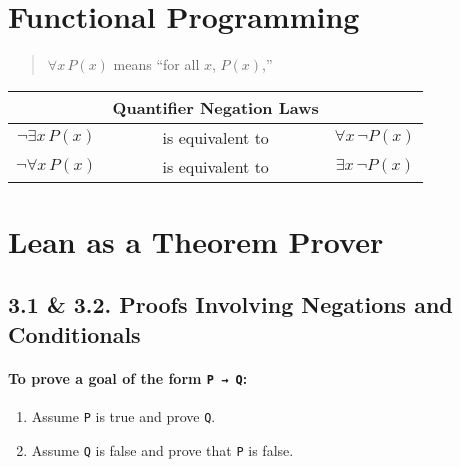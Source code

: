 \documentclass[
  letterpaper,
  DIV=11,
  numbers=noendperiod]{scrreprt}
\providecommand{\tightlist}{%
  \setlength{\itemsep}{0pt}\setlength{\parskip}{0pt}}\usepackage{longtable,booktabs,array}
\theoremstyle{remark}
\begin{document}
\hypertarget{functional-programming}{%
\chapter{Functional Programming}\label{functional-programming}}


\begin{quote}
\(\forall x\,P(x)\) means ``for all \(x\), \(P(x)\),''

\end{quote}

\begin{longtable}[]{@{}ccc@{}}
\toprule\noalign{}
& Quantifier Negation Laws & \\
\midrule\noalign{}
\endhead
\bottomrule\noalign{}
\endlastfoot
\(\neg \exists x\,P(x)\) & is equivalent to &
\(\forall x\,\neg P(x)\) \\
\(\neg \forall x\,P(x)\) & is equivalent to &
\(\exists x\,\neg P(x)\) \\
\end{longtable}


\hypertarget{lean-as-a-theorem-prover}{%
\chapter{Lean as a Theorem Prover}\label{lean-as-a-theorem-prover}}

\hypertarget{proofs-involving-negations-and-conditionals}{%
\section{3.1 \& 3.2. Proofs Involving Negations and
Conditionals}\label{proofs-involving-negations-and-conditionals}}

\hypertarget{to-prove-a-goal-of-the-form-p-q}{%
\subsubsection{\texorpdfstring{To prove a goal of the form
\texttt{P\ →\ Q}:}{To prove a goal of the form P → Q:}}\label{to-prove-a-goal-of-the-form-p-q}}

\begin{enumerate}
\def\labelenumi{\arabic{enumi}.}
\tightlist
\item
  Assume \texttt{P} is true and prove \texttt{Q}.
\item
  Assume \texttt{Q} is false and prove that \texttt{P} is false.
\end{enumerate}
\end{document}
